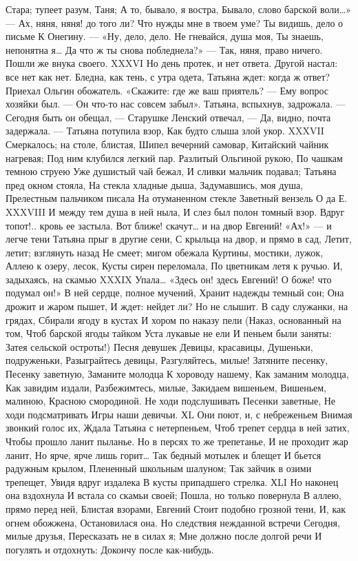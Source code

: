 Стара; тупеет разум, Таня;
А то, бывало, я востра,
Бывало, слово барской воли…»
— Ах, няня, няня! до того ли?
Что нужды мне в твоем уме?
Ты видишь, дело о письме
К Онегину. — «Ну, дело, дело.
Не гневайся, душа моя,
Ты знаешь, непонятна я…
Да что ж ты снова побледнела?»
— Так, няня, право ничего.
Пошли же внука своего.
XXXVI
Но день протек, и нет ответа.
Другой настал: все нет как нет.
Бледна, как тень, с утра одета,
Татьяна ждет: когда ж ответ?
Приехал Ольгин обожатель.
«Скажите: где же ваш приятель? —
Ему вопрос хозяйки был. —
Он что-то нас совсем забыл».
Татьяна, вспыхнув, задрожала.
— Сегодня быть он обещал, —
Старушке Ленский отвечал, —
Да, видно, почта задержала. —
Татьяна потупила взор,
Как будто слыша злой укор.
XXXVII
Смеркалось; на столе, блистая,
Шипел вечерний самовар,
Китайский чайник нагревая;
Под ним клубился легкий пар.
Разлитый Ольгиной рукою,
По чашкам темною струею
Уже душистый чай бежал,
И сливки мальчик подавал;
Татьяна пред окном стояла,
На стекла хладные дыша,
Задумавшись, моя душа,
Прелестным пальчиком писала
На отуманенном стекле
Заветный вензель О да Е.
XXXVIII
И между тем душа в ней ныла,
И слез был полон томный взор.
Вдруг топот!.. кровь ее застыла.
Вот ближе! скачут… и на двор
Евгений! «Ах!» — и легче тени
Татьяна прыг в другие сени,
С крыльца на двор, и прямо в сад,
Летит, летит; взглянуть назад
Не смеет; мигом обежала
Куртины, мостики, лужок,
Аллею к озеру, лесок,
Кусты сирен переломала,
По цветникам летя к ручью.
И, задыхаясь, на скамью
XXXIX
Упала…
«Здесь он! здесь Евгений!
О боже! что подумал он!»
В ней сердце, полное мучений,
Хранит надежды темный сон;
Она дрожит и жаром пышет,
И ждет: нейдет ли? Но не слышит.
В саду служанки, на грядах,
Сбирали ягоду в кустах
И хором по наказу пели
(Наказ, основанный на том,
Чтоб барской ягоды тайком
Уста лукавые не ели
И пеньем были заняты:
Затея сельской остроты!)
Песня девушек
Девицы, красавицы,
Душеньки, подруженьки,
Разыграйтесь девицы,
Разгуляйтесь, милые!
Затяните песенку,
Песенку заветную,
Заманите молодца
К хороводу нашему,
Как заманим молодца,
Как завидим издали,
Разбежимтесь, милые,
Закидаем вишеньем,
Вишеньем, малиною,
Красною смородиной.
Не ходи подслушивать
Песенки заветные,
Не ходи подсматривать
Игры наши девичьи.
ХL
Они поют, и, с небреженьем
Внимая звонкий голос их,
Ждала Татьяна с нетерпеньем,
Чтоб трепет сердца в ней затих,
Чтобы прошло ланит пыланье.
Но в персях то же трепетанье,
И не проходит жар ланит,
Но ярче, ярче лишь горит…
Так бедный мотылек и блещет
И бьется радужным крылом,
Плененный школьным шалуном;
Так зайчик в озими трепещет,
Увидя вдруг издалека
В кусты припадшего стрелка.
ХLI
Но наконец она вздохнула
И встала со скамьи своей;
Пошла, но только повернула
В аллею, прямо перед ней,
Блистая взорами, Евгений
Стоит подобно грозной тени,
И, как огнем обожжена,
Остановилася она.
Но следствия нежданной встречи
Сегодня, милые друзья,
Пересказать не в силах я;
Мне должно после долгой речи
И погулять и отдохнуть:
Докончу после как-нибудь.
